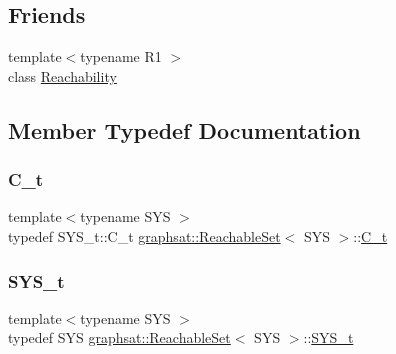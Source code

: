 \subsection*{Friends}
\begin{DoxyCompactItemize}
\item 
{\footnotesize template$<$typename R1 $>$ }\\class \mbox{\hyperlink{classgraphsat_1_1_reachable_set_ac274586d6140dff44fa1029371c2cf48}{Reachability}}
\end{DoxyCompactItemize}


\subsection{Member Typedef Documentation}
\mbox{\label{classgraphsat_1_1_reachable_set_a0b7981a216ec4c46be913e08d5f0cd07}} 
\subsubsection{\texorpdfstring{C\_t}{C\_t}}
{\footnotesize\ttfamily template$<$typename S\+YS $>$ \\
typedef S\+Y\+S\+\_\+t\+::\+C\+\_\+t \mbox{\hyperlink{classgraphsat_1_1_reachable_set}{graphsat\+::\+Reachable\+Set}}$<$ S\+YS $>$\+::\mbox{\hyperlink{classgraphsat_1_1_reachable_set_a0b7981a216ec4c46be913e08d5f0cd07}{C\+\_\+t}}}

\mbox{\label{classgraphsat_1_1_reachable_set_a28cb7ce6be4d0a31c7249085f09432c5}} 
\subsubsection{\texorpdfstring{SYS\_t}{SYS\_t}}
{\footnotesize\ttfamily template$<$typename S\+YS $>$ \\
typedef S\+YS \mbox{\hyperlink{classgraphsat_1_1_reachable_set}{graphsat\+::\+Reachable\+Set}}$<$ S\+YS $>$\+::\mbox{\hyperlink{classgraphsat_1_1_reachable_set_a28cb7ce6be4d0a31c7249085f09432c5}{S\+Y\+S\+\_\+t}}}



